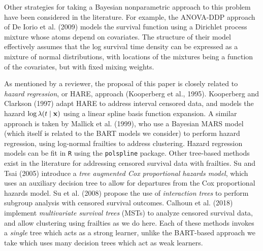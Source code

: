 \documentclass[11pt]{article}
\begin{document}
\color{red}
 
Other strategies for taking a Bayesian nonparametric approach to this problem have been considered in the literature. For example, the ANOVA-DDP approach of De Iorio et al. (2009) models the survival function using a Dirichlet process mixture whose atoms depend on covariates. The structure of their model effectively assumes that the log survival time density can be expressed as a mixture of normal distributions, with locations of the mixtures being a function of the covariates, but with fixed mixing weights. 

As mentioned by a reviewer, the proposal of this paper is closely related to \emph{hazard regression}, or HARE, approach (Kooperberg et al., 1995). Kooperberg and Clarkson (1997) adapt HARE to address interval censored data, and models the hazard $\log \lambda(t \mid \bf x)$ using a linear spline basis function expansion. A similar approach is taken by Mallick et al. (1999), who use a Bayesian MARS model (which itself is related to the BART models we consider) to perform hazard regression, using log-normal frailties to address clustering. Hazard regression models can be fit in \texttt{R} using the \texttt{polspline} package.
Other tree-based methods exist in the literature for addressing censored survival data with frailties. Su and Tsai (2005) introduce a \emph{tree augmented Cox proportional hazards model}, which uses an auxiliary decision tree to allow for departures from the Cox proportional hazards model. Su et al. (2008) propose the use of \emph{interaction trees} to perform subgroup analysis with censored survival outcomes. Calhoun et al. (2018) implement \emph{multivariate survival trees} (MSTs) to analyze censored survival data, and allow clustering using frailties as we do here. Each of these methods invokes a \emph{single} tree which acts as a strong learner, unlike the BART-based approach we take which uses many decision trees which act as weak learners.

\normalcolor
\end{document}
